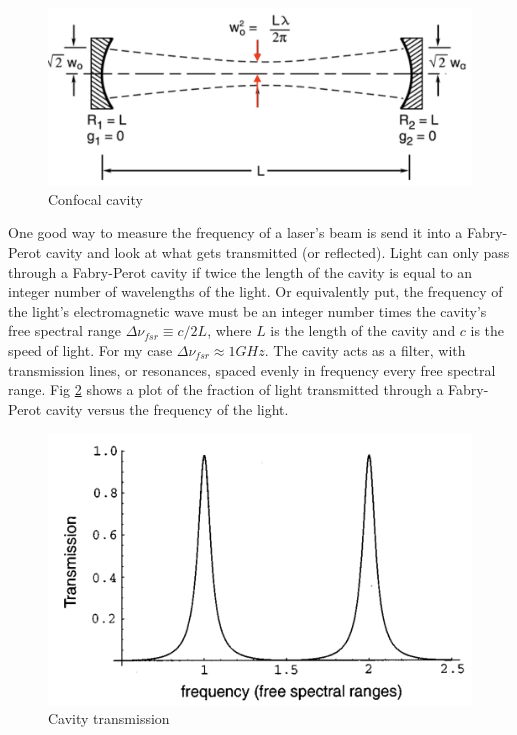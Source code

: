 \documentclass[12pt]{report}
\begin{document}
\begin{figure}[H]
    \centering
    \includegraphics[width = .8\textwidth]{confocalCavity.png}
    \caption{Confocal cavity}
    \label{fig:confocalCavity}
\end{figure}

One good way to measure the frequency of a laser's beam is send it into a Fabry-Perot cavity and look at what gets transmitted (or reflected). Light can only pass through a Fabry-Perot cavity if twice the length of the cavity is equal to an integer number of wavelengths of the light. Or equivalently put, the frequency of the light's electromagnetic wave must be an integer number times the cavity's free spectral range $\Delta \nu_{fsr} \equiv c/2L$, where $L$ is the length of the cavity and $c$ is the speed of light. For my case $\Delta \nu_{fsr} \approx 1GHz$. The cavity acts as a filter, with transmission lines, or resonances, spaced evenly in frequency every free spectral range. Fig \ref{fig:cavityTransmission}  shows a plot of the fraction of light transmitted through a Fabry-Perot cavity versus the frequency of the light. \cite{PDHintro}\cite{fundamentalsOfPhotonics}

\begin{figure}[H]
    \centering
    \includegraphics[width=.8\textwidth]{cavityTransmission.png}
    \caption{Cavity transmission}
    \label{fig:cavityTransmission}
\end{figure}
\end{document}
